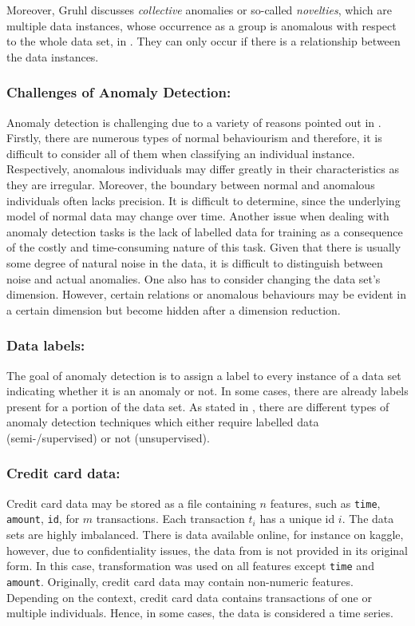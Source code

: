 Moreover, Gruhl discusses \textit{collective} anomalies or so-called \textit{novelties}, which are multiple data instances, whose occurrence as a group is anomalous with respect to the whole data set, in \cite{gruhl2022}. They can only occur if there is a relationship between the data instances.


\subsubsection{Challenges of Anomaly Detection:}
Anomaly detection is challenging due to a variety of reasons pointed out in \cite{gruhl2022, ff_review_techniques}.
Firstly, there are numerous types of normal behaviourism and therefore, it is difficult to consider all of them when classifying an individual instance. Respectively, anomalous individuals may differ greatly in their characteristics as they are irregular.
Moreover, the boundary between normal and anomalous individuals often lacks precision. 
It is difficult to determine, since the underlying model of normal data may change over time.
Another issue when dealing with anomaly detection tasks is the lack of labelled data for training as a consequence of the costly and time-consuming nature of this task.
Given that there is usually some degree of natural noise in the data, it is difficult to distinguish between noise and actual anomalies.
One also has to consider changing the data set's dimension. However, certain relations or anomalous behaviours may be evident in a certain dimension but become hidden after a dimension reduction.


\subsubsection{Data labels:}
The goal of anomaly detection is to assign a label to every instance of a data set indicating whether it is an anomaly or not.
In some cases, there are already labels present for a portion of the data set.
As stated in \cite{ff_review_techniques}, there are different types of anomaly detection techniques which either require labelled data (semi-/supervised) or not (unsupervised).


\subsubsection{Credit card data:}
Credit card data may be stored as a file containing $n$ features, such as \texttt{time}, \texttt{amount}, \texttt{id}, for $m$ transactions. 
Each transaction $t_i$ has a unique id $i$.
The data sets are highly imbalanced.
There is data available online, for instance on kaggle, however, due to confidentiality issues, the data from \cite{kaggle_ex} is not provided in its original form.
In this case,  transformation was used on all features except \texttt{time} and \texttt{amount}.
Originally, credit card data may contain non-numeric features.
Depending on the context, credit card data contains transactions of one or multiple individuals.
Hence, in some cases, the data is considered a time series.


